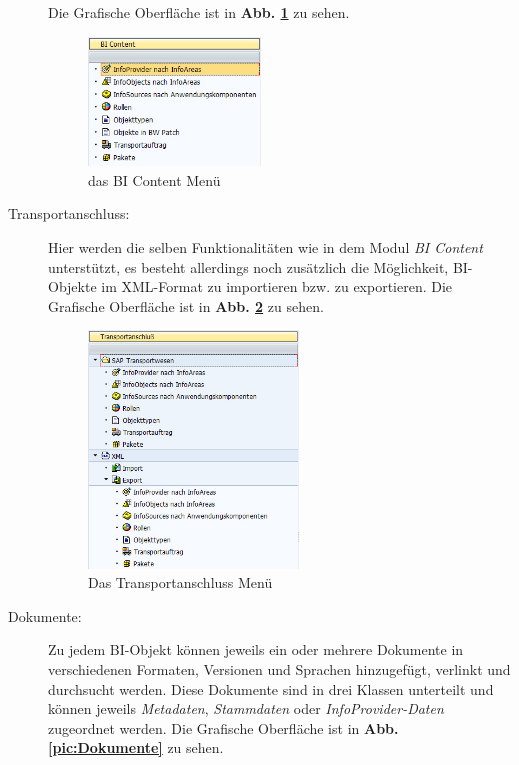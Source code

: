 \begin{description}
Die Grafische Oberfläche ist in \textbf{Abb. \ref{pic:BIContent}} zu sehen.
\begin{figure}[H]
    \centering
    \includegraphics[width=0.45\textwidth]{files/BIContent}
    \caption{das BI Content Menü}
    \label{pic:BIContent}
\end{figure}
\item[Transportanschluss:] Hier werden die selben Funktionalitäten wie in dem Modul \textit{BI Content} unterstützt, es besteht allerdings noch zusätzlich die Möglichkeit, BI-Objekte im XML-Format zu importieren bzw. zu exportieren.
Die Grafische Oberfläche ist in \textbf{Abb. \ref{pic:Transportanschluss}} zu sehen.
\begin{figure}[H]
    \centering
    \includegraphics[width=0.55\textwidth]{files/Transportanschluss}
    \caption{Das Transportanschluss Menü}
    \label{pic:Transportanschluss}
\end{figure}
\item[Dokumente:] Zu jedem BI-Objekt können jeweils ein oder mehrere Dokumente in verschiedenen Formaten, Versionen und Sprachen hinzugefügt, verlinkt und durchsucht werden. Diese Dokumente sind in drei Klassen unterteilt und können jeweils \textit{Metadaten}, \textit{Stammdaten} oder \textit{InfoProvider-Daten} zugeordnet werden.
Die Grafische Oberfläche ist in  \textbf{Abb. \ref{pic:Dokumente}}  zu sehen.

\end{description}
